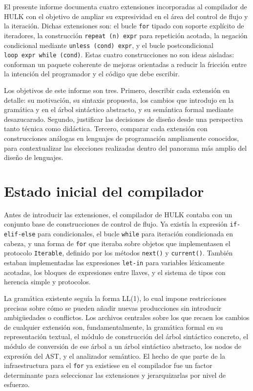 \documentclass[12pt, a4paper]{article}
\begin{document}
El presente informe documenta cuatro extensiones incorporadas al compilador de HULK con el objetivo de ampliar su expresividad en el área del control de flujo y la iteración. Dichas extensiones son: el bucle \texttt{for} tipado con soporte explícito de iteradores, la construcción \texttt{repeat~(n)~expr} para repetición acotada, la negación condicional mediante \texttt{unless~(cond)~expr}, y el bucle postcondicional \texttt{loop~expr~while~(cond)}. Estas cuatro construcciones no son ideas aisladas: conforman un paquete coherente de mejoras orientadas a reducir la fricción entre la intención del programador y el código que debe escribir.

Los objetivos de este informe son tres. Primero, describir cada extensión en detalle: su motivación, su sintaxis propuesta, los cambios que introdujo en la gramática y en el árbol sintáctico abstracto, y su semántica formal mediante desazucarado. Segundo, justificar las decisiones de diseño desde una perspectiva tanto técnica como didáctica. Tercero, comparar cada extensión con construcciones análogas en lenguajes de programación ampliamente conocidos, para contextualizar las elecciones realizadas dentro del panorama más amplio del diseño de lenguajes.

\section{Estado inicial del compilador}

Antes de introducir las extensiones, el compilador de HULK contaba con un conjunto base de construcciones de control de flujo. Ya existía la expresión \texttt{if-elif-else} para condicionales, el bucle \texttt{while} para iteración condicionada en cabeza, y una forma de \texttt{for} que iteraba sobre objetos que implementasen el protocolo \texttt{Iterable}, definido por los métodos \texttt{next()} y \texttt{current()}. También estaban implementadas las expresiones \texttt{let-in} para variables léxicamente acotadas, los bloques de expresiones entre llaves, y el sistema de tipos con herencia simple y protocolos.

La gramática existente seguía la forma LL(1), lo cual impone restricciones precisas sobre cómo se pueden añadir nuevas producciones sin introducir ambigüedades o conflictos. Los archivos centrales sobre los que recaen los cambios de cualquier extensión son, fundamentalmente, la gramática formal en su representación textual, el módulo de construcción del árbol sintáctico concreto, el módulo de conversión de ese árbol a un árbol sintáctico abstracto, los nodos de expresión del AST, y el analizador semántico. El hecho de que parte de la infraestructura para el \texttt{for} ya existiese en el compilador fue un factor determinante para seleccionar las extensiones y jerarquizarlas por nivel de esfuerzo.
\end{document}
